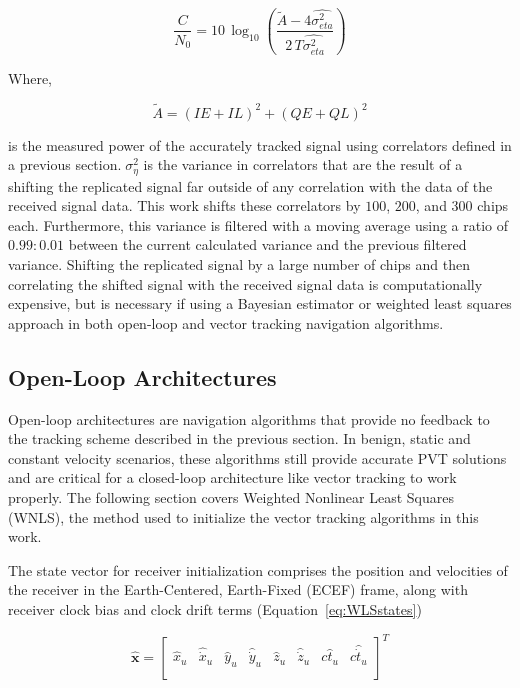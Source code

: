 \begin{equation}\label{eq:CN0}
    \frac{C}{N_0} = 10\,\log_{10} {\left(\frac{\tilde{A} - 4\hat{\sigma_{eta}^2}}{2\,T\hat{\sigma_{eta}^2}}\right)}
\end{equation}

Where,

\begin{equation}\label{eq:ampitude}
    \tilde{A} = {\left(IE +IL\right)}^2 + {\left(QE + QL\right)}^2
\end{equation}

is the measured power of the accurately tracked signal using correlators defined in a previous section.\( \; \sigma_{\eta}^2\) is the variance in correlators that are the result of a shifting the replicated signal far outside of any correlation with the data of the received signal data. This work shifts these correlators by \(100\), \(200\), and \(300\) chips each. Furthermore, this variance is filtered with a moving average using a ratio of \(0.99:0.01\) between the current calculated variance and the previous filtered variance. Shifting the replicated signal by a large number of chips and then correlating the shifted signal with the received signal data is computationally expensive, but is necessary if using a Bayesian estimator or weighted least squares approach in both open-loop and vector tracking navigation algorithms.


\subsection{Open-Loop Architectures}
Open-loop architectures are navigation algorithms that provide no feedback to the tracking scheme described in the previous section. In benign, static and constant velocity scenarios, these algorithms still provide accurate PVT solutions and are critical for a closed-loop architecture like vector tracking to work properly. The following section covers Weighted Nonlinear Least Squares (WNLS), the method used to initialize the vector tracking algorithms in this work.

The state vector for receiver initialization comprises the position and velocities of the receiver in the Earth-Centered, Earth-Fixed (ECEF) frame, along with receiver clock bias and clock drift terms (Equation~\ref{eq:WLSstates})

\begin{equation}\label{eq:WLSstates}
    \hat{\mathbf{x}} =
    \begin{bmatrix}
        \hat{x}_u & \hat{\dot{x}}_u & \hat{y}_u & \hat{\dot{y}}_u & \hat{z}_u & \hat{\dot{z}}_u & c\hat{t}_u & c\hat{\dot{t}}_u \\
    \end{bmatrix}^T
\end{equation}

